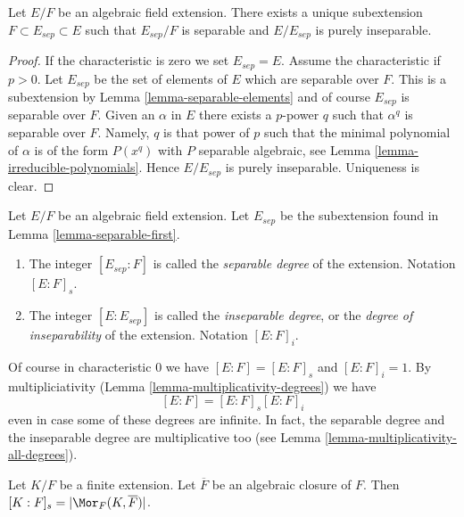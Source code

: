 \begin{lemma}
\label{lemma-separable-first}
Let $E/F$ be an algebraic field extension. There exists a unique subextension
$F \subset E_{sep} \subset E$ such that $E_{sep}/F$ is separable and
$E/E_{sep}$ is purely inseparable.
\end{lemma}

\begin{proof}
If the characteristic is zero we set $E_{sep} = E$. Assume the characteristic
if $p > 0$. Let $E_{sep}$ be the set of elements of $E$ which are separable
over $F$. This is a subextension by Lemma \ref{lemma-separable-elements}
and of course $E_{sep}$ is separable over $F$. Given an $\alpha$ in $E$
there exists a $p$-power $q$ such that $\alpha^q$ is separable over $F$.
Namely, $q$ is that power of $p$ such that the minimal polynomial of
$\alpha$ is of the form $P(x^q)$ with $P$ separable algebraic, see
Lemma \ref{lemma-irreducible-polynomials}. Hence $E/E_{sep}$ is purely
inseparable. Uniqueness is clear.
\end{proof}

\begin{definition}
\label{definition-insep-degree}
Let $E/F$ be an algebraic field extension. Let $E_{sep}$ be the subextension
found in Lemma \ref{lemma-separable-first}.
\begin{enumerate}
\item The integer $[E_{sep} : F]$ is called the {\it separable
degree} of the extension. Notation $[E : F]_s$.
\item The integer $[E : E_{sep}]$ is called the {\it inseparable
degree}, or the {\it degree of inseparability} of the extension.
Notation $[E : F]_i$.
\end{enumerate}
\end{definition}

\noindent
Of course in characteristic $0$ we have $[E : F] = [E : F]_s$ and
$[E : F]_i = 1$. By multipliciativity
(Lemma \ref{lemma-multiplicativity-degrees}) we have
$$
[E : F] = [E : F]_s [E : F]_i
$$
even in case some of these degrees are infinite. In fact, the separable
degree and the inseparable degree are multiplicative too (see
Lemma \ref{lemma-multiplicativity-all-degrees}).

\begin{lemma}
\label{lemma-separable-degree}
Let $K/F$ be a finite extension. Let $\overline{F}$ be an algebraic
closure of $F$. Then $[K : F]_s = |\Mor_F(K, \overline{F})|$.
\end{lemma}


